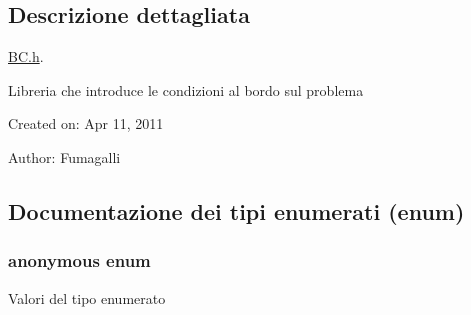 \subsection{Descrizione dettagliata}
\hyperlink{BC_8h}{B\-C.\-h}. 

Libreria che introduce le condizioni al bordo sul problema

Created on\-: Apr 11, 2011

Author\-: Fumagalli 

\subsection{Documentazione dei tipi enumerati (enum)}
\hypertarget{classBC_ad1b507696802f73b95c0ca59f4c41390}{\subsubsection[{anonymous enum}]{\setlength{\rightskip}{0pt plus 5cm}anonymous enum}}\label{classBC_ad1b507696802f73b95c0ca59f4c41390}
\begin{Desc}
\item[Valori del tipo enumerato]\par
\begin{description}
\item[{\em 
\hypertarget{classBC_ad1b507696802f73b95c0ca59f4c41390a99103ccd54ba29b1bd2670cc6cd0c462}{D\-I\-R\-I\-C\-H\-L\-E\-T\-\_\-\-B\-O\-U\-N\-D\-A\-R\-Y\-\_\-\-N\-U\-M}\label{classBC_ad1b507696802f73b95c0ca59f4c41390a99103ccd54ba29b1bd2670cc6cd0c462}
}]\item[{\em 
\hypertarget{classBC_ad1b507696802f73b95c0ca59f4c41390a432aa77a00d8eb4929463ef8d57b5c04}{N\-E\-U\-M\-A\-N\-N\-\_\-\-B\-O\-U\-N\-D\-A\-R\-Y\-\_\-\-N\-U\-M}\label{classBC_ad1b507696802f73b95c0ca59f4c41390a432aa77a00d8eb4929463ef8d57b5c04}
}]\end{description}
\end{Desc}

